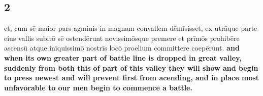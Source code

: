 \documentclass{article}
\begin{document}
\subsection*{2}
et, cum sē maior pars agminis in magnam convallem dēmīsisset, ex utrāque parte eius vallis subitō sē ostendērunt novissimōsque premere et prīmōs prohibēre ascensū atque inīquissimō nostrīs locō proelium committere coepērunt.
\textbf{and when its own greater part of battle line is dropped in great valley, suddenly from both this of part of this valley they will show and begin to press newest and will prevent first from acending, and in place most unfavorable to our men begin to commence a battle.  }
\end{document}
